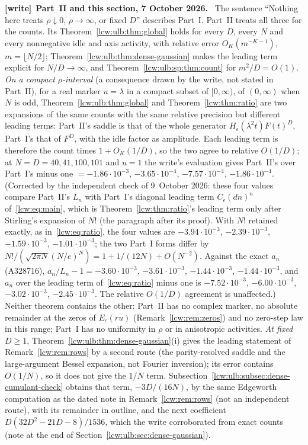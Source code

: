 \documentclass[11pt,letterpaper]{article}
\theoremstyle{remark}\newtheorem{remark}[theorem]{Remark}
\newenvironment{writenote}[1][]{\par\smallskip\begingroup\small
 \noindent\textbf{[write]}\if\relax\detokenize{#1}\relax\else~\textbf{#1.}\fi\ }%
 {\par\endgroup\smallskip}
\begin{document}
\begin{writenote}[Part~II and this section, 7 October 2026]
The sentence ``Nothing here treats $\rho\downarrow0$, $\rho\to\infty$, or fixed
$D$'' describes Part~I. Part~II treats all three for the counts.
Its Theorem~\ref{lcw:ulb:thm:global} holds for every $D$, every $N$ and every
nonnegative idle and axis activity, with relative error $O_K(m^{-K-1})$,
$m=\lfloor N/2\rfloor$; Theorem~\ref{lcw:ulb:thm:dense-gaussian} makes the
leading term explicit for $N/D\to\infty$, and
Theorem~\ref{lcw:ulb:sp:thm:count} for $m^2/D=O(1)$. \emph{On a compact
$\rho$-interval} (a consequence drawn by the write, not stated in Part~II),
for a real marker $u=\lambda$ in a compact subset of $[0,\infty)$, of
$(0,\infty)$ when $N$ is odd,
Theorem~\ref{lcw:ulb:thm:global} and Theorem~\ref{lcw:thm:ratio} are two
expansions of the same counts with the same relative precision but different
leading terms: Part~II's saddle is that of the whole generator
$H_\epsilon(\lambda^2t)F(t)^D$, Part~I's that of $F^D$, with the idle factor
as amplitude. Each leading term is therefore the count times
$1+O_K(1/D)$, so the two agree to relative $O(1/D)$; at $N=D=40,41,100,101$
and $u=1$ the write's evaluation gives Part~II's over Part~I's minus one
$=-1.86\cdot10^{-3}$, $-3.65\cdot10^{-4}$, $-7.57\cdot10^{-4}$,
$-1.86\cdot10^{-4}$. \textup{(Corrected by the independent check of
9~October 2026: these four values compare Part~II's $L_n$ with Part~I's
diagonal leading term $C_\epsilon(dn)^n$ of~\eqref{lcw:eq:main}, which is
Theorem~\ref{lcw:thm:ratio}'s leading term only after Stirling's expansion
of $N!$ (the paragraph after its proof). With $N!$ retained exactly, as
in~\eqref{lcw:eq:ratio}, the four values are $-3.94\cdot10^{-3}$,
$-2.39\cdot10^{-3}$, $-1.59\cdot10^{-3}$, $-1.01\cdot10^{-3}$; the two
Part~I forms differ by $N!/(\sqrt{2\pi N}(N/e)^N)=1+1/(12N)+O(N^{-2})$.
Against the exact $a_n$ (A328716), $a_n/L_n-1=-3.60\cdot10^{-3}$,
$-3.61\cdot10^{-3}$, $-1.44\cdot10^{-3}$, $-1.44\cdot10^{-3}$, and $a_n$ over
the leading term of~\eqref{lcw:eq:ratio} minus one is $-7.52\cdot10^{-3}$,
$-6.00\cdot10^{-3}$, $-3.02\cdot10^{-3}$, $-2.45\cdot10^{-3}$. The relative
$O(1/D)$ agreement is unaffected.)} Neither theorem contains the other: Part~II has no
complex marker, no absolute remainder at the zeros of $E_\epsilon(ru)$
(Remark~\ref{lcw:rem:zeros}) and no zero-step law in this range; Part~I has
no uniformity in $\rho$ or in anisotropic activities. \emph{At fixed $D\ge1$},
Theorem~\ref{lcw:ulb:thm:dense-gaussian}(i) gives the leading statement of
Remark~\ref{lcw:rem:rows} by a second route (the parity-resolved saddle and
the large-argument Bessel expansion, not Fourier inversion); its error
contains $O(1/N)$, so it does not give the $1/N$ term.
Subsection~\ref{lcw:ulb:subsec:dense-cumulant-check} obtains that term,
$-3D/(16N)$, by the same Edgeworth computation as the dated note in
Remark~\ref{lcw:rem:rows} (not an independent route), with its remainder in
outline, and the next coefficient $D(32D^2-21D-8)/1536$, which the write
corroborated from exact counts (note at the end of
Section~\ref{lcw:ulb:sec:dense-gaussian}).
\end{writenote}
\end{document}
